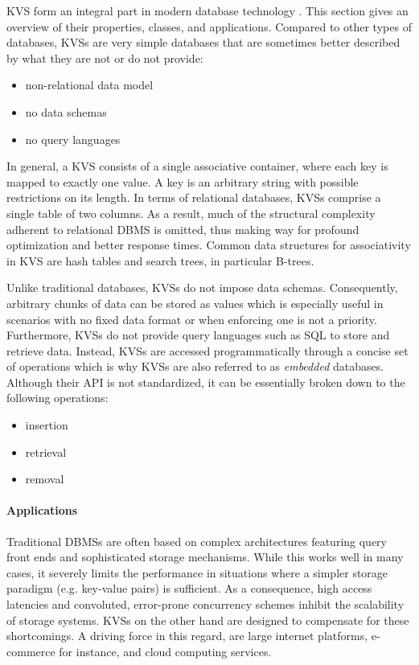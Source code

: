 \ac{KVS} form an integral part in modern database technology
\cite{fiebig2016one}. This section gives an overview of their properties,
classes, and applications. Compared to other types of databases, \acp{KVS} are
very simple databases that are sometimes better described by what they are not
or do not provide:

\begin{itemize}
    \item non-relational data model
    \item no data schemas
    \item no query languages
\end{itemize}

In general, a \ac{KVS} consists of a single associative container, where each
key is mapped to exactly one value. A key is an arbitrary string with possible
restrictions on its length. In terms of relational databases, \acp{KVS} comprise
a single table of two columns. As a result, much of the structural complexity
adherent to relational \ac{DBMS} is omitted, thus making way for profound
optimization and better response times. Common data structures for associativity
in \ac{KVS} are hash tables and search trees, in particular B-trees.

Unlike traditional databases, \acp{KVS} do not impose data schemas. Consequently,
arbitrary chunks of data can be stored as values which is especially useful in
scenarios with no fixed data format or when enforcing one is not a priority.
Furthermore, \acp{KVS} do not provide query languages such as SQL to store and
retrieve data. Instead, \acp{KVS} are accessed programmatically through a concise
set of operations which is why \acp{KVS} are also referred to as \emph{embedded}
databases. Although their \ac{API} is not standardized, it can be essentially
broken down to the following operations:

\begin{itemize}
    \item insertion
    \item retrieval
    \item removal
\end{itemize}

\paragraph{Applications}

Traditional \acp{DBMS} are often based on complex architectures featuring query
front ends and sophisticated storage mechanisms. While this works well in many
cases, it severely limits the performance in situations where a simpler storage
paradigm (e.g. key-value pairs) is sufficient. As a consequence, high access
latencies and convoluted, error-prone concurrency schemes inhibit the
scalability of storage systems. \acp{KVS} on the other hand are designed to
compensate for these shortcomings. A driving force in this regard, are large
internet platforms, e-commerce for instance, and cloud computing services.

